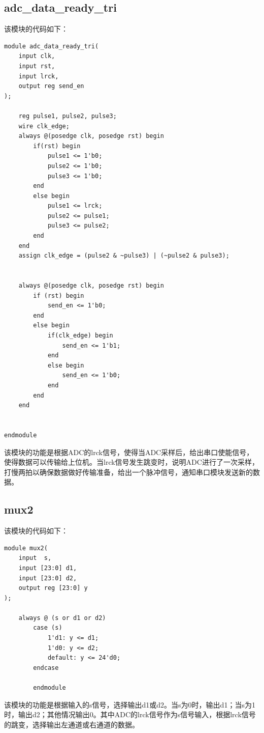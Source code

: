 \documentclass[UTF8]{ctexart}
\begin{document}
\subsection{adc\_data\_ready\_tri}
该模块的代码如下：
\begin{framed}
    \begin{lstlisting}[style=verilogStyle]
module adc_data_ready_tri(
    input clk,
    input rst,
    input lrck,
    output reg send_en
);

    reg pulse1, pulse2, pulse3;
    wire clk_edge;
    always @(posedge clk, posedge rst) begin
        if(rst) begin
            pulse1 <= 1'b0;
            pulse2 <= 1'b0;
            pulse3 <= 1'b0;
        end
        else begin
            pulse1 <= lrck;
            pulse2 <= pulse1;
            pulse3 <= pulse2;
        end
    end
    assign clk_edge = (pulse2 & ~pulse3) | (~pulse2 & pulse3);


    always @(posedge clk, posedge rst) begin
        if (rst) begin
            send_en <= 1'b0;
        end
        else begin
            if(clk_edge) begin
                send_en <= 1'b1;
            end
            else begin
                send_en <= 1'b0;
            end
        end
    end


endmodule
    \end{lstlisting}
\end{framed}

该模块的功能是根据ADC的lrck信号，使得当ADC采样后，给出串口使能信号，使得数据可以传输给上位机。当lrck信号发生跳变时，说明ADC进行了一次采样，打慢两拍以确保数据做好传输准备，给出一个脉冲信号，通知串口模块发送新的数据。

\subsection{mux2}
该模块的代码如下：
\begin{framed}
    \begin{lstlisting}[style=verilogStyle]
module mux2(
    input  s,
    input [23:0] d1,
    input [23:0] d2,
    output reg [23:0] y
);

    always @ (s or d1 or d2)
        case (s)
            1'd1: y <= d1;
            1'd0: y <= d2;
            default: y <= 24'd0;
        endcase

        endmodule

    \end{lstlisting}    
\end{framed}

该模块的功能是根据输入的s信号，选择输出d1或d2。当s为0时，输出d1；当s为1时，输出d2；其他情况输出0。其中ADC的lrck信号作为s信号输入，根据lrck信号的跳变，选择输出左通道或右通道的数据。
\end{document}
